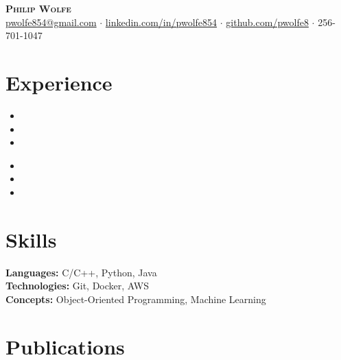 \documentclass[11pt, a4paper]{article}
\newcommand{\header}[7]{
  \begin{center}
    {\LARGE \bfseries\scshape #1}\\
    \vspace{2mm}
    \href{mailto:#2}{#2} $\cdot$ \href{#3}{#6} $\cdot$ \href{#4}{#7} $\cdot$ #5\\
    \vspace{0mm}
  \end{center}
}
\begin{document}
\header{Philip Wolfe}{pwolfe854@gmail.com}{https://www.linkedin.com/in/pwolfe854}{https://github.com/pwolfe8}{256-701-1047}{linkedin.com/in/pwolfe854}{github.com/pwolfe8}

\section*{Experience}

\workplaceGTRI
\begin{itemize}
  \item \fpgaShort
  \item \fpgaMedium
  \item \fpgaLong
\end{itemize}

\workplaceBeam
\begin{itemize}
  \item \fpgaShort
  \item \fpgaMedium
  \item \fpgaLong
\end{itemize}


\educationSimple

\section*{Skills}
\textbf{Languages:} C/C++, Python, Java\\
\textbf{Technologies:} Git, Docker, AWS\\
\textbf{Concepts:} Object-Oriented Programming, Machine Learning

\section*{Publications}
{\scriptsize
\publications
}
\end{document}
